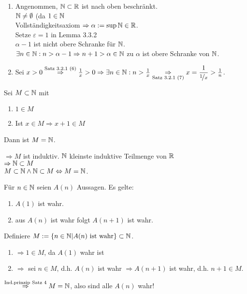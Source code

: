 \documentclass[../ana1.tex]{subfiles}
\begin{document}
\begin{bew}\leavevmode
	\begin{enumerate}
		\item Angenommen, \( \mathbb{N}\subset\mathbb{R} \) ist nach oben beschränkt.\\
			\( \mathbb{N} \neq \emptyset \) (da \(1\in\mathbb{N} \) \\
			Vollständigkeitsaxiom \( \Rightarrow \alpha := \sup \mathbb{N} \in \mathbb{R} \).\\
			Setze \( \varepsilon = 1\) in Lemma 3.3.2\\ %
			\( \alpha -1\) ist nicht obere Schranke für \( \mathbb{N} \).\\
			\( \exists n\in \mathbb{N}: n>\alpha-1\\
			\Rightarrow n+1 > \alpha \in \mathbb{N} \) \Lightning{} zu \( \alpha \) ist obere Schranke von \( \mathbb{N} \).
		\item Sei \(x>0 \overset{\text{Satz 3.2.1 (6)}}{\Rightarrow} \frac{1}{x} > 0\Rightarrow \exists n\in \mathbb{N}: n > \frac{1}{x}\underset{\text{Satz 3.2.1 (7)}}{\Rightarrow} x = \dfrac{1}{\nicefrac{1}{x}} > \frac{1}{n}\). %
	\end{enumerate}
\end{bew}
\begin{satz}[Induktionsprinzip]
	Sei \(M\subset \mathbb{N} \) mit
	\begin{enumerate}
		\item \(1\in M\)
		\item Ist \(x\in M \Rightarrow x+1 \in M\)
	\end{enumerate}
	Dann ist \(M= \mathbb{N} \).
\end{satz}
\begin{bew}
	\( \Rightarrow M\) ist induktiv. \( \mathbb{N} \) kleinste induktive Teilmenge von \( \mathbb{R} \) \\
	\( \Rightarrow \mathbb{N} \subset M\) \\
	\(M\subset \mathbb{N} \wedge \mathbb{N} \subset M \Leftrightarrow M = \mathbb{N} \).
\end{bew}
\begin{kor}
	Für \(n\in\mathbb{N} \) seien \(A(n)\) Aussagen.
	Es gelte:
	\begin{enumerate}
		\item \(A(1)\) ist wahr.
		\item aus \(A(n)\) ist wahr folgt \(A(n+1)\) ist wahr.
	\end{enumerate}
\end{kor}
\begin{bew}
	Definiere \(M := \{n\in \mathbb{N}| A(n) \text{ ist wahr}\} \subset \mathbb{N} \).
	\begin{enumerate}
		\item \( \Rightarrow 1\in M\), da \(A(1)\) wahr ist
		\item \( \Rightarrow \) sei \(n\in M\), d.h. \(A(n)\) ist wahr \( \Rightarrow A(n+1)\) ist wahr, d.h. \(n+1\in M\).
	\end{enumerate}
	\( \overset{\text{Ind.prinzip Satz 4}}{\Rightarrow} M = \mathbb{N} \), also sind alle \(A(n)\) wahr! %
\end{bew}
\end{document}
